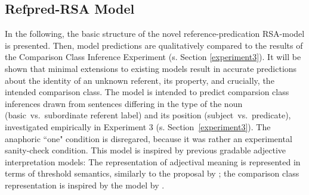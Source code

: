 \subsection{Refpred-RSA Model}
\label{refpred-rsa}
In the following, the basic structure of the novel reference-predication RSA-model is presented. %
Then, model predictions are qualitatively compared to the results of the Comparison Class Inference Experiment (s. Section \ref{experiment3}). It will be shown that minimal extensions to existing models result in accurate predictions about the identity of an unknown referent, its property, and crucially, the intended comparison class. 
The model is intended to predict comparsion class inferences drawn from sentences differing in the type of the noun (basic~vs.~subordinate referent label) and its position (subject~vs.~predicate), investigated empirically in Experiment 3 (s. Section~\ref{experiment3}). The anaphoric ``one" condition is disregared, because it was rather an experimental sanity-check condition. This model is inspired by previous gradable adjective interpretation models: The representation of adjectival meaning is represented in terms of threshold semantics, similarly to the proposal by \textcite{lassiter2013context}; the comparison class representation is inspired by the model by \textcite{tessler2017warm}.

